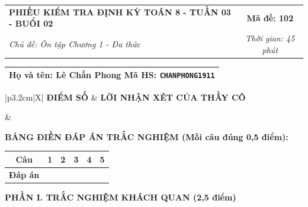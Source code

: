 \documentclass[12pt,a4paper]{article}
\begin{document}
\newpage


\noindent
\begin{tabularx}{\linewidth}{|X|c|}
\hline
\textbf{PHIẾU KIỂM TRA ĐỊNH KỲ TOÁN 8 - TUẦN 03 - BUỔI 02} & \textbf{Mã đề: 102} \\
\textit{Chủ đề: Ôn tập Chương 1 - Đa thức} & \textit{Thời gian: 45 phút} \\
\hline
\end{tabularx}

\vspace{1mm}

\noindent
\begin{tabularx}{\linewidth}{|X|}
\hline
\rule[-2mm]{0pt}{7.5mm}\textbf{Họ và tên:} \textbf{\large Lê Chấn Phong} \hfill \textbf{Mã HS:} \texttt{CHANPHONG1911} \quad \\
\hline
\end{tabularx}

\vspace{1mm}

\noindent
\begin{tabularx}{\linewidth}{|p{3.2cm}|X|}
\hline
\centering\textbf{ĐIỂM SỐ} & \centering\textbf{LỜI NHẬN XÉT CỦA THẦY CÔ} \tabularnewline
\hline
\rule{0pt}{1.3cm} & \tabularnewline
\hline
\end{tabularx}

\vspace{1.2mm}

\noindent\textbf{BẢNG ĐIỀN ĐÁP ÁN TRẮC NGHIỆM (Mỗi câu đúng 0,5 điểm):}
\vspace{0.8mm}

\noindent
\renewcommand{\arraystretch}{1.35}
\begin{tabularx}{\linewidth}{|c|*{5}{>{\centering\arraybackslash}X|}}
\hline
\textbf{Câu} & \textbf{1} & \textbf{2} & \textbf{3} & \textbf{4} & \textbf{5} \\
\hline
\textbf{Đáp án} & & & & & \\
\hline
\end{tabularx}
\renewcommand{\arraystretch}{1.0}

\vspace{1.5mm}

\noindent\textbf{\large PHẦN I. TRẮC NGHIỆM KHÁCH QUAN (2,5 điểm)}
\vspace{1mm}
\end{document}
